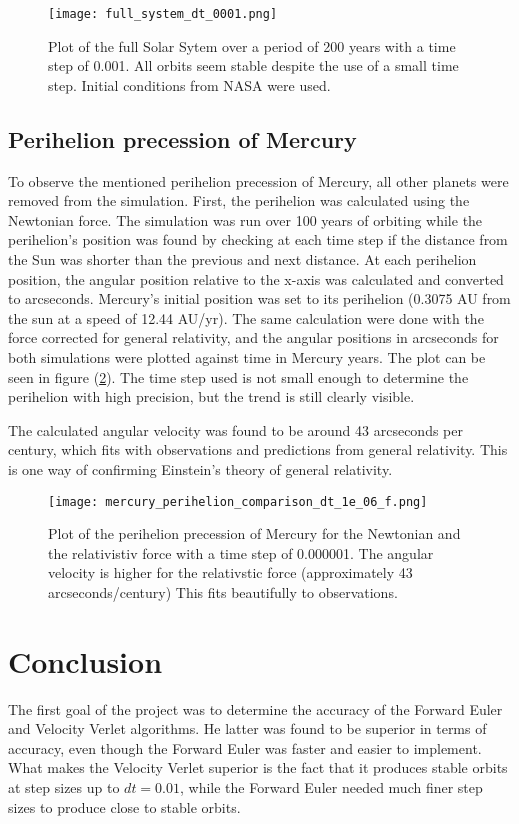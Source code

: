 \documentclass[10pt,a4paper,titlepage]{article}
\begin{document}
\begin{figure}[]
\centering
\centering\texttt{[image: full\_system\_dt\_0001.png]}
\caption{Plot of the full Solar Sytem over a period of 200 years with a time step of 0.001. All orbits seem stable despite the use of a small time step. Initial conditions from NASA were used. \label{fig:full_system}}
\end{figure}

\subsection{Perihelion precession of Mercury}
To observe the mentioned perihelion precession of Mercury, all other planets were removed from the simulation. First, the perihelion was calculated using the Newtonian force. The simulation was run over 100 years of orbiting while the perihelion's position was found by checking at each time step if the distance from the Sun was shorter than the previous and next distance. At each perihelion position, the angular position relative to the x-axis was calculated and converted to arcseconds. Mercury's initial position was set to its perihelion (0.3075 AU from the sun at a speed of 12.44 AU/yr). The same calculation were done with the force corrected for general relativity, and the angular positions in arcseconds for both simulations were plotted against time in Mercury years. The plot can be seen in figure (\ref{fig:mercury}). The time step used is not small enough to determine the perihelion with high precision, but the trend is still clearly visible.

The calculated angular velocity was found to be around 43 arcseconds per century, which fits with observations and predictions from general relativity. This is one way of confirming Einstein's theory of general relativity.

\begin{figure}[]
\centering
\centering\texttt{[image: mercury\_perihelion\_comparison\_dt\_1e\_06\_f.png]}
\caption{Plot of the perihelion precession of Mercury for the Newtonian and the relativistiv force with a time step of 0.000001. The angular velocity is higher for the relativstic force (approximately 43 arcseconds/century) This fits beautifully to observations.  \label{fig:mercury}}
\end{figure}

\section{Conclusion}
The first goal of the project was to determine the accuracy of the Forward Euler and Velocity Verlet algorithms. He latter was found to be superior in terms of accuracy, even though the Forward Euler was faster and easier to implement. What makes the Velocity Verlet superior is the fact that it produces stable orbits at step sizes up to $dt = \mathrm{0.01}$, while the Forward Euler needed much finer step sizes to produce close to stable orbits. 
\end{document}
